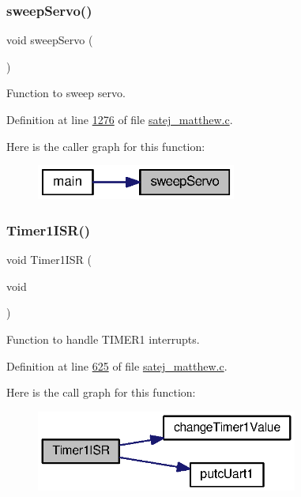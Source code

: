 \subsubsection{\texorpdfstring{sweepServo()}{sweepServo()}}
{\footnotesize\ttfamily void sweep\+Servo (\begin{DoxyParamCaption}{ }\end{DoxyParamCaption})}



Function to sweep servo. 



Definition at line \mbox{\hyperlink{satej__matthew_8c_source_l01276}{1276}} of file \mbox{\hyperlink{satej__matthew_8c_source}{satej\+\_\+matthew.\+c}}.

Here is the caller graph for this function\+:
\nopagebreak
\begin{figure}[H]
\begin{center}
\leavevmode
\includegraphics[width=186pt]{satej__matthew_8c_a086130ac68735e2ba8d56b2dfe45b914_icgraph}
\end{center}
\end{figure}
\mbox{\label{satej__matthew_8c_a7829469bbaa6a5d7e77e19e1d55b673e}} 
\subsubsection{\texorpdfstring{Timer1ISR()}{Timer1ISR()}}
{\footnotesize\ttfamily void Timer1\+I\+SR (\begin{DoxyParamCaption}\item[{void}]{ }\end{DoxyParamCaption})}



Function to handle T\+I\+M\+E\+R1 interrupts. 



Definition at line \mbox{\hyperlink{satej__matthew_8c_source_l00625}{625}} of file \mbox{\hyperlink{satej__matthew_8c_source}{satej\+\_\+matthew.\+c}}.

Here is the call graph for this function\+:
\nopagebreak
\begin{figure}[H]
\begin{center}
\leavevmode
\includegraphics[width=244pt]{satej__matthew_8c_a7829469bbaa6a5d7e77e19e1d55b673e_cgraph}
\end{center}
\end{figure}
\mbox{\label{satej__matthew_8c_af0a12620be9cfe02c43ff4c8d6556fe2}} 
